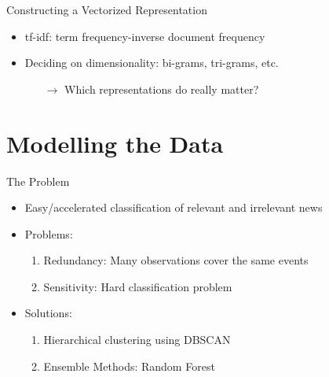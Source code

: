 \documentclass{beamer}
\begin{document}
\begin{frame}{Constructing a Vectorized Representation}
\begin{itemize}
\item tf-idf: term frequency-inverse document frequency 
\item Deciding on dimensionality: bi-grams, tri-grams, etc.
	\begin{itemize}
		\item[$\to$] Which representations do really matter?
	\end{itemize}
 
\end{itemize}
\end{frame}

\section{Modelling the Data}
\begin{frame}{The Problem}
\begin{itemize}

\item Easy/accelerated classification of relevant and irrelevant news
\item Problems:
	\begin{enumerate}
		\item Redundancy: Many observations cover the same events
		\item Sensitivity: Hard classification problem
	\end{enumerate}

\item Solutions: 
	\begin{enumerate}
		\item Hierarchical clustering using DBSCAN
		\item Ensemble Methods: Random Forest
	\end{enumerate}

\end{itemize}
\end{frame}
\end{document}
